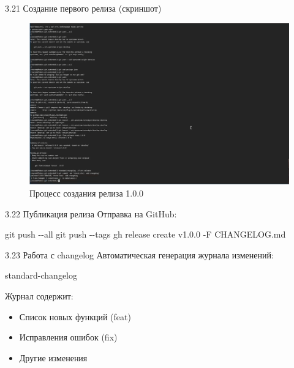\documentclass[
  ignorenonframetext,
  aspectratio=169,
  russian,
]{beamer}
\newenvironment{Shaded}{\begin{snugshade}}{\end{snugshade}}
\newcommand{\AttributeTok}[1]{\textcolor[rgb]{0.40,0.45,0.13}{#1}}
\newcommand{\ExtensionTok}[1]{\textcolor[rgb]{0.00,0.23,0.31}{#1}}
\newcommand{\FunctionTok}[1]{\textcolor[rgb]{0.28,0.35,0.67}{#1}}
\newcommand{\NormalTok}[1]{\textcolor[rgb]{0.00,0.23,0.31}{#1}}
\providecommand{\tightlist}{%
  \setlength{\itemsep}{0pt}\setlength{\parskip}{0pt}}
\begin{document}
\begin{frame}{3.21 Создание первого релиза (скриншот)}
\label{ux441ux43eux437ux434ux430ux43dux438ux435-ux43fux435ux440ux432ux43eux433ux43e-ux440ux435ux43bux438ux437ux430-ux441ux43aux440ux438ux43dux448ux43eux442}
\begin{figure}[H]

{\centering \includegraphics[width=0.8\linewidth,height=\textheight,keepaspectratio]{image/first release.png}

}

\caption{Процесс создания релиза 1.0.0}

\end{figure}%
\end{frame}

\begin{frame}[fragile]{3.22 Публикация релиза}
\label{ux43fux443ux431ux43bux438ux43aux430ux446ux438ux44f-ux440ux435ux43bux438ux437ux430}
Отправка на GitHub:

\begin{Shaded}
\begin{Highlighting}[]
\FunctionTok{git}\NormalTok{ push }\AttributeTok{{-}{-}all}
\FunctionTok{git}\NormalTok{ push }\AttributeTok{{-}{-}tags}
\ExtensionTok{gh}\NormalTok{ release create v1.0.0 }\AttributeTok{{-}F}\NormalTok{ CHANGELOG.md}
\end{Highlighting}
\end{Shaded}
\end{frame}

\begin{frame}[fragile]{3.23 Работа с changelog}
\label{ux440ux430ux431ux43eux442ux430-ux441-changelog}
Автоматическая генерация журнала изменений:

\begin{Shaded}
\begin{Highlighting}[]
\ExtensionTok{standard{-}changelog}
\end{Highlighting}
\end{Shaded}

Журнал содержит:

\begin{itemize}[<+->]
\tightlist
\item
  Список новых функций (feat)
\item
  Исправления ошибок (fix)
\item
  Другие изменения
\end{itemize}
\end{frame}
\end{document}
